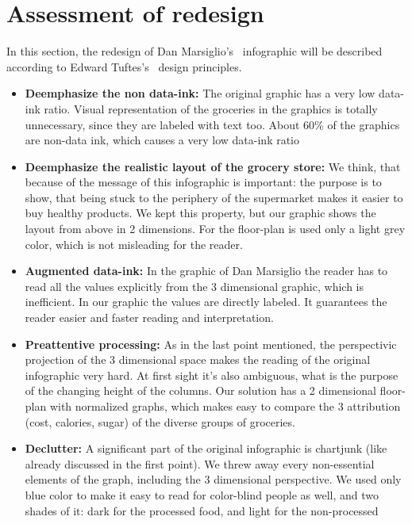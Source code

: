 \section{Assessment of redesign}

In this section, the redesign of Dan Marsiglio's~\cite{DanMarsiglio2008} infographic will be described according to Edward Tuftes's~\cite{Tufte2001} design principles.

\begin{itemize}
	\item \textbf{Deemphasize the non data-ink:} The original graphic has a very
		low data-ink ratio. Visual representation of the groceries in the graphics
		is totally unnecessary, since they are labeled with text too. About 60\% of
		the graphics are non-data ink, which causes a very low data-ink ratio

	\item \textbf{Deemphasize the realistic layout of the grocery store:} We
		think, that because of the message of this infographic is important: the
		purpose is to show, that being stuck to the periphery of the supermarket
		makes it easier to buy healthy products. We kept this property, but our
		graphic shows the layout from above in 2 dimensions. For the floor-plan is
		used only a light grey color, which is not misleading for the reader.
		
	\item \textbf{Augmented data-ink:} In the graphic of Dan Marsiglio the reader
		has to read all the values explicitly from the 3 dimensional graphic, which
		is inefficient. In our graphic the values are directly labeled. It
		guarantees the reader easier and faster reading and interpretation.

	\item \textbf{Preattentive processing:} As in the last point mentioned, the
		perspectivic projection of the 3 dimensional space makes the reading of
		the original infographic very hard. At first sight it's also ambiguous,
		what is the purpose of the changing height of the columns. Our solution
		has a 2 dimensional floor-plan with normalized graphs, which makes easy to
		compare the 3 attribution (cost, calories, sugar) of the diverse groups of
		groceries.

	\item \textbf{Declutter:} A significant part of the original infographic is
		chartjunk (like already discussed in the first point). We threw away every
		non-essential elements of the graph, including the 3 dimensional
		perspective. We used only blue color to make it easy to read for color-blind
		people as well, and two shades of it: dark for the processed food, and light
		for the non-processed


\end{itemize}
